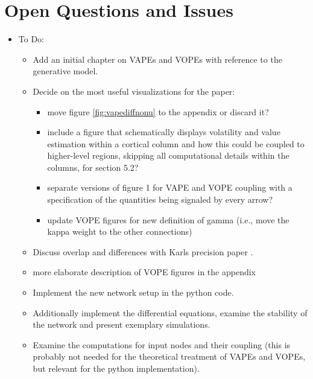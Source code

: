 \section{Open Questions and Issues}

\begin{itemize}
	\item To Do: 
	\begin{itemize}
		\item Add an initial chapter on VAPEs and VOPEs with reference to the generative model.
		\item Decide on the most useful visualizations for the paper: 
		\begin{itemize}
			\item move figure \ref{fig:vapediffnonu} to the appendix or discard it?
			\item include a figure that schematically displays volatility and value estimation within a cortical column and how this could be coupled to higher-level regions, skipping all computational details within the columns, for section 5.2?
			\item separate versions of figure 1 for VAPE and VOPE coupling with a specification of the quantities being signaled by every arrow?
			\item update VOPE figures for new definition of gamma (i.e., move the kappa weight to the other connections)
		\end{itemize}
		\item Discuss overlap and differences with Karls precision paper \cite{Kanai2015}.
		\item more elaborate description of VOPE figures in the appendix
		\item Implement the new network setup in the python code.
		\item Additionally implement the differential equations, examine the stability of the network and present exemplary simulations. 
		\item Examine the computations for input nodes and their coupling (this is probably not needed for the theoretical treatment of \textsf{VAPE}s and \textsf{VOPE}s, but relevant for the python implementation).
		\end{itemize}
	

\end{itemize}
